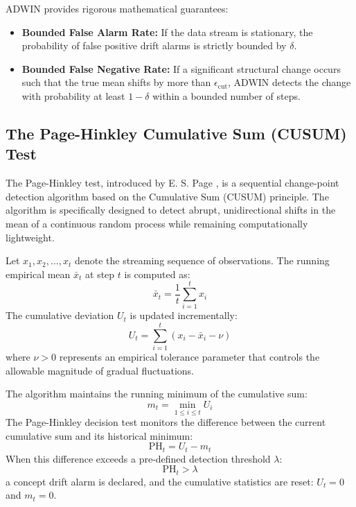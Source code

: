 \documentclass[12pt,a4paper,oneside]{report}
\begin{document}
ADWIN provides rigorous mathematical guarantees:
\begin{itemize}
    \item \textbf{Bounded False Alarm Rate:} If the data stream is stationary, the probability of false positive drift alarms is strictly bounded by $\delta$.
    \item \textbf{Bounded False Negative Rate:} If a significant structural change occurs such that the true mean shifts by more than $\epsilon_{\text{cut}}$, ADWIN detects the change with probability at least $1 - \delta$ within a bounded number of steps.
\end{itemize}

\subsection{The Page-Hinkley Cumulative Sum (CUSUM) Test}
The Page-Hinkley test, introduced by E. S. Page \cite{page1954}, is a sequential change-point detection algorithm based on the Cumulative Sum (CUSUM) principle. The algorithm is specifically designed to detect abrupt, unidirectional shifts in the mean of a continuous random process while remaining computationally lightweight.

Let $x_1, x_2, \dots, x_t$ denote the streaming sequence of observations. The running empirical mean $\bar{x}_t$ at step $t$ is computed as:
\begin{equation}
\bar{x}_t = \frac{1}{t} \sum_{i=1}^t x_i
\end{equation}
The cumulative deviation $U_t$ is updated incrementally:
\begin{equation}
U_t = \sum_{i=1}^t (x_i - \bar{x}_i - \nu)
\end{equation}
where $\nu > 0$ represents an empirical tolerance parameter that controls the allowable magnitude of gradual fluctuations.

The algorithm maintains the running minimum of the cumulative sum:
\begin{equation}
m_t = \min_{1 \le i \le t} U_i
\end{equation}
The Page-Hinkley decision test monitors the difference between the current cumulative sum and its historical minimum:
\begin{equation}
\text{PH}_t = U_t - m_t
\end{equation}
When this difference exceeds a pre-defined detection threshold $\lambda$:
\begin{equation}
\text{PH}_t > \lambda
\end{equation}
a concept drift alarm is declared, and the cumulative statistics are reset: $U_t = 0$ and $m_t = 0$.
\end{document}
